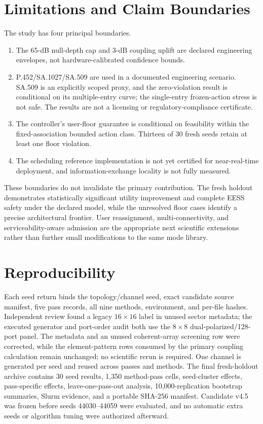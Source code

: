 \documentclass[journal]{IEEEtran}
\begin{document}
\section{Limitations and Claim Boundaries}
The study has four principal boundaries.
\begin{enumerate}
\item The 65-dB null-depth cap and 3-dB coupling uplift are declared engineering envelopes, not hardware-calibrated confidence bounds.
\item P.452/SA.1027/SA.509 are used in a documented engineering scenario. SA.509 is an explicitly scoped proxy, and the zero-violation result is conditional on its multiple-entry curve; the single-entry frozen-action stress is not safe. The results are not a licensing or regulatory-compliance certificate.
\item The controller's user-floor guarantee is conditional on feasibility within the fixed-association bounded action class. Thirteen of 30 fresh seeds retain at least one floor violation.
\item The scheduling reference implementation is not yet certified for near-real-time deployment, and information-exchange locality is not fully measured.
\end{enumerate}
These boundaries do not invalidate the primary contribution. The fresh holdout demonstrates statistically significant utility improvement and complete EESS safety under the declared model, while the unresolved floor cases identify a precise architectural frontier. User reassignment, multi-connectivity, and serviceability-aware admission are the appropriate next scientific extensions rather than further small modifications to the same mode library.

\section{Reproducibility}
Each seed return binds the topology/channel seed, exact candidate source manifest, five pass records, all nine methods, environment, and per-file hashes. Independent review found a legacy $16\times16$ label in unused sector metadata; the executed generator and port-order audit both use the $8\times8$ dual-polarized/128-port panel. The metadata and an unused coherent-array screening row were corrected, while the element-pattern rows consumed by the primary coupling calculation remain unchanged; no scientific rerun is required. One channel is generated per seed and reused across passes and methods. The final fresh-holdout archive contains 30 seed results, 1,350 method-pass cells, seed-cluster effects, pass-specific effects, leave-one-pass-out analysis, 10,000-replication bootstrap summaries, Slurm evidence, and a portable SHA-256 manifest. Candidate v4.5 was frozen before seeds 44030--44059 were evaluated, and no automatic extra seeds or algorithm tuning were authorized afterward.
\end{document}
